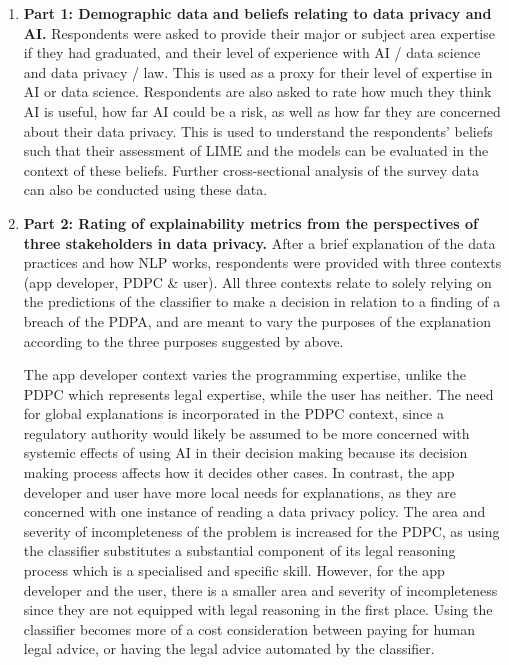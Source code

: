 \begin{enumerate}
	\item \textbf{Part 1: Demographic data and beliefs relating to data privacy and AI.} Respondents were asked to provide their major or subject area expertise if they had graduated, and their level of experience with AI / data science and data privacy / law. This is used as a proxy for their level of expertise in AI or data science. Respondents are also asked to rate how much they think AI is useful, how far AI could be a risk, as well as how far they are concerned about their data privacy. This is used to understand the respondents' beliefs such that their assessment of LIME and the models can be evaluated in the context of these beliefs. Further cross-sectional analysis of the survey data can also be conducted using these data.
	
	\item \textbf{Part 2: Rating of explainability metrics from the perspectives of three stakeholders in data privacy.} After a brief explanation of the data practices and how NLP works, respondents were provided with three contexts (app developer, PDPC \& user). All three contexts relate to solely relying on the predictions of the classifier to make a decision in relation to a finding of a breach of the PDPA, and are meant to vary the purposes of the explanation according to the three purposes suggested by \cite{doshi-velez2017} above. 
	
	The app developer context varies the programming expertise, unlike the PDPC which represents legal expertise, while the user has neither. The need for global explanations is incorporated in the PDPC context, since a regulatory authority would likely be assumed to be more concerned with systemic effects of using AI in their decision making because its decision making process affects how it decides other cases. In contrast, the app developer and user have more local needs for explanations, as they are concerned with one instance of reading a data privacy policy. The area and severity of incompleteness of the problem is increased for the PDPC, as using the classifier substitutes a substantial component of its legal reasoning process which is a specialised and specific skill. However, for the app developer and the user, there is a smaller area and severity of incompleteness since they are not equipped with legal reasoning in the first place. Using the classifier becomes more of a cost consideration between paying for human legal advice, or having the legal advice automated by the classifier.
	

\end{enumerate}
